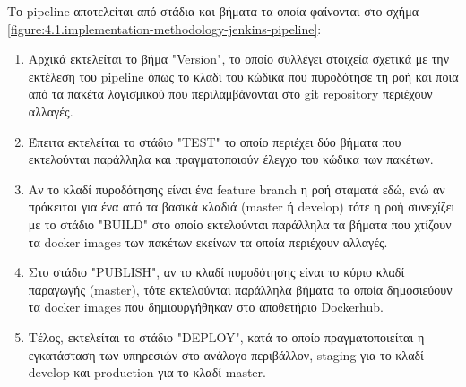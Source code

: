 Το pipeline αποτελείται από στάδια και βήματα τα οποία φαίνονται στο σχήμα \ref{figure:4.1.implementation-methodology-jenkins-pipeline}:

\begin{enumerate}
    \item Αρχικά εκτελείται το βήμα "Version", το οποίο συλλέγει στοιχεία σχετικά με την εκτέλεση του pipeline όπως το κλαδί του κώδικα που πυροδότησε τη ροή και ποια από τα πακέτα λογισμικού που περιλαμβάνονται στο git repository περιέχουν αλλαγές.
    \item Έπειτα εκτελείται το στάδιο "TEST" το οποίο περιέχει δύο βήματα που εκτελούνται παράλληλα και πραγματοποιούν έλεγχο του κώδικα των πακέτων.
    \item Αν το κλαδί πυροδότησης είναι ένα feature branch η ροή σταματά εδώ, ενώ αν πρόκειται για ένα από τα βασικά κλαδιά (master ή develop) τότε η ροή συνεχίζει με το στάδιο "BUILD" στο οποίο εκτελούνται παράλληλα τα βήματα που χτίζουν τα docker images των πακέτων εκείνων τα οποία περιέχουν αλλαγές.
    \item Στο στάδιο "PUBLISH", αν το κλαδί πυροδότησης είναι το κύριο κλαδί παραγωγής (master), τότε εκτελούνται παράλληλα βήματα τα οποία δημοσιεύουν τα docker images που δημιουργήθηκαν στο αποθετήριο Dockerhub.
    \item Τέλος, εκτελείται το στάδιο "DEPLOY", κατά το οποίο πραγματοποιείται η εγκατάσταση των υπηρεσιών στο ανάλογο περιβάλλον, staging για το κλαδί develop και production για το κλαδί master.
\end{enumerate}

